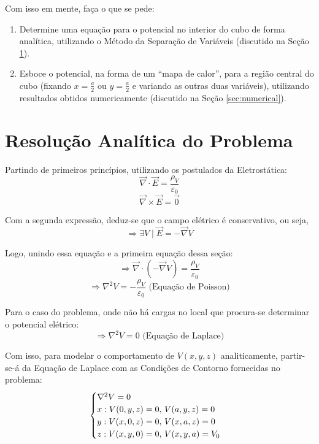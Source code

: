 \documentclass{report}
\let\oldsection\section
\renewcommand\section{\clearpage\oldsection}
\begin{document}
Com isso em mente, faça o que se pede:
\begin{enumerate}
    \item Determine uma equação para o potencial no interior do cubo de forma analítica, utilizando o Método da Separação de Variáveis
    (discutido na Seção \ref{sec:analysis}).
    \item Esboce o potencial, na forma de um ``mapa de calor”, para a região central do cubo (fixando $ x = \frac{a}{2} $
    ou $ y = \frac{a}{2} $ e variando as outras duas variáveis), utilizando resultados obtidos numericamente (discutido na Seção
    \ref{sec:numerical}).
\end{enumerate}

\section{Resolução Analítica do Problema}
\label{sec:analysis}

Partindo de primeiros princípios, utilizando os postulados da Eletrostática:
$$ \overrightarrow{\nabla}\cdot \overrightarrow{E} = \frac{\rho_V}{\varepsilon_0} $$
$$ \overrightarrow{\nabla}\times \overrightarrow{E} = \overrightarrow{0} $$

Com a segunda expressão, deduz-se que o campo elétrico é conservativo, ou seja,
$$ \Rightarrow \exists V \mid \overrightarrow{E} = -\overrightarrow{\nabla} V $$

Logo, unindo essa equação e a primeira equação dessa seção:
$$ \Rightarrow \overrightarrow{\nabla}\cdot(-\overrightarrow{\nabla} V) = \frac{\rho_V}{\varepsilon_0} $$
$$ \Rightarrow \nabla^2V = -\frac{\rho_V}{\varepsilon_0} \text{ (Equação de Poisson)} $$

Para o caso do problema, onde não há cargas no local que procura-se determinar o potencial elétrico:
$$ \Rightarrow \nabla^2V = 0 \text{ (Equação de Laplace)} $$

Com isso, para modelar o comportamento de $ V(x, y, z) $ analiticamente, partir-se-á da Equação
de Laplace com as Condições de Contorno fornecidas no problema:
\begin{equation}
  \label{eq:laplace}
  \centering
  \begin{cases}
    \nabla^2 V = 0 \\
    x: V(0, y, z) = 0,\, V(a, y, z) = 0 \\
    y: V(x, 0, z) = 0,\, V(x, a, z) = 0 \\
    z: V(x, y, 0) = 0,\, V(x, y, a) = V_0
  \end{cases}
\end{equation}
\end{document}

